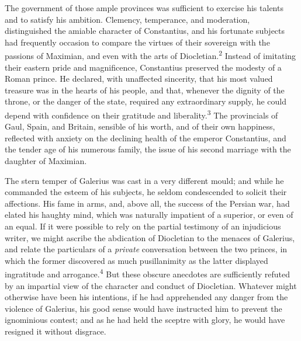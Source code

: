 The government of those ample provinces was sufficient to
exercise his talents and to satisfy his ambition. Clemency,
temperance, and moderation, distinguished the amiable character
of Constantius, and his fortunate subjects had frequently
occasion to compare the virtues of their sovereign with the
passions of Maximian, and even with the arts of Diocletian.\textsuperscript{2}
Instead of imitating their eastern pride and magnificence,
Constantius preserved the modesty of a Roman prince. He declared,
with unaffected sincerity, that his most valued treasure was in
the hearts of his people, and that, whenever the dignity of the
throne, or the danger of the state, required any extraordinary
supply, he could depend with confidence on their gratitude and
liberality.\textsuperscript{3} The provincials of Gaul, Spain, and Britain,
sensible of his worth, and of their own happiness, reflected with
anxiety on the declining health of the emperor Constantius, and
the tender age of his numerous family, the issue of his second
marriage with the daughter of Maximian.



The stern temper of Galerius was cast in a very different mould;
and while he commanded the esteem of his subjects, he seldom
condescended to solicit their affections. His fame in arms, and,
above all, the success of the Persian war, had elated his haughty
mind, which was naturally impatient of a superior, or even of an
equal. If it were possible to rely on the partial testimony of an
injudicious writer, we might ascribe the abdication of Diocletian
to the menaces of Galerius, and relate the particulars of a
\textit{private} conversation between the two princes, in which the
former discovered as much pusillanimity as the latter displayed
ingratitude and arrogance.\textsuperscript{4} But these obscure anecdotes are
sufficiently refuted by an impartial view of the character and
conduct of Diocletian. Whatever might otherwise have been his
intentions, if he had apprehended any danger from the violence of
Galerius, his good sense would have instructed him to prevent the
ignominious contest; and as he had held the sceptre with glory,
he would have resigned it without disgrace.

